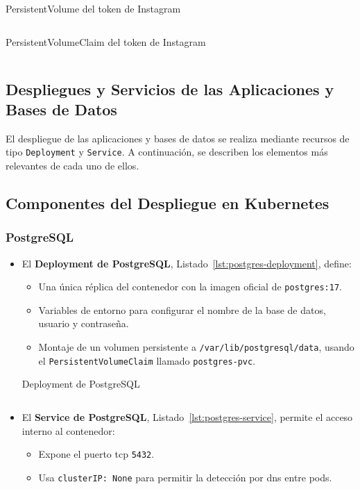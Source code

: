 \begin{itemize}
  \begin{longlisting}
  \caption{PersistentVolume del token de Instagram}
  \inputminted[firstline=55,lastline=65]{yaml}{../backend/despliegue/kubernetes/despliegue.yaml}
  \label{lst:pv-token}
  \end{longlisting}

  \begin{longlisting}
  \caption{PersistentVolumeClaim del token de Instagram}
  \inputminted[firstline=69,lastline=78]{yaml}{../backend/despliegue/kubernetes/despliegue.yaml}
  \label{lst:pvc-token}
  \end{longlisting}
\end{itemize}

\subsection{Despliegues y Servicios de las Aplicaciones y Bases de Datos}
El despliegue de las aplicaciones y bases de datos se realiza mediante recursos de tipo \texttt{Deployment} y \texttt{Service}. A continuación, se describen los elementos más relevantes de cada uno de ellos.
\subsection*{Componentes del Despliegue en Kubernetes}

\subsubsection*{PostgreSQL}
\begin{itemize}
  \item El \textbf{Deployment de PostgreSQL}, Listado~\ref{lst:postgres-deployment}, define:
  \begin{itemize}
    \item Una única réplica del contenedor con la imagen oficial de \texttt{postgres:17}.
    \item Variables de entorno para configurar el nombre de la base de datos, usuario y contraseña.
    \item Montaje de un volumen persistente a \texttt{/var/lib/postgresql/data}, usando el \texttt{PersistentVolumeClaim} llamado \texttt{postgres-pvc}.
  \end{itemize}
  \begin{longlisting}
\caption{Deployment de PostgreSQL}
\inputminted[firstline=84,lastline=116]{yaml}{../backend/despliegue/kubernetes/despliegue.yaml}
\label{lst:postgres-deployment}
\end{longlisting}
  \item El \textbf{Service de PostgreSQL}, Listado~\ref{lst:postgres-service}, permite el acceso interno al contenedor:
  \begin{itemize}
    \item Expone el puerto \gls{tcp} \texttt{5432}.
    \item Usa \texttt{clusterIP: None} para permitir la detección por \gls{dns} entre pods.
  \end{itemize}
\end{itemize}

